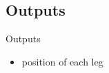 \documentclass[xcolor=x11names,compress]{beamer}
\renewcommand{\(}{\begin{columns}}
\renewcommand{\)}{\end{columns}}
\newcommand{\<}[1]{\begin{column}{#1}}
\renewcommand{\>}{\end{column}}
\begin{document}
%
%
%
%
%
%
%
%
%
%
%

\subsection{Outputs}
\begin{frame}{Outputs}
\begin{itemize}
\item position of each leg 
\end{itemize}


\end{frame}
\end{document}
